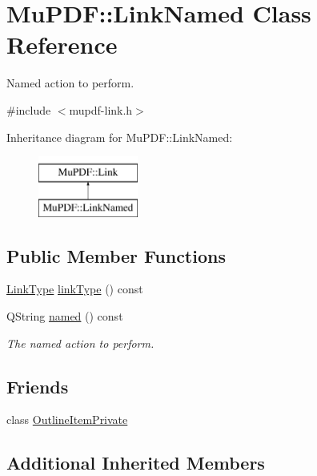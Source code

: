 \hypertarget{class_mu_p_d_f_1_1_link_named}{\section{Mu\-P\-D\-F\-:\-:Link\-Named Class Reference}
\label{class_mu_p_d_f_1_1_link_named}
}


Named action to perform.  




{\ttfamily \#include $<$mupdf-\/link.\-h$>$}

Inheritance diagram for Mu\-P\-D\-F\-:\-:Link\-Named\-:\begin{figure}[H]
\begin{center}
\leavevmode
\includegraphics[height=2.000000cm]{class_mu_p_d_f_1_1_link_named}
\end{center}
\end{figure}
\subsection*{Public Member Functions}
\begin{DoxyCompactItemize}
\item 
\hyperlink{class_mu_p_d_f_1_1_link_afdc6828b6e00f323b53d6ae36d0d06b6}{Link\-Type} \hyperlink{class_mu_p_d_f_1_1_link_named_af1037fb72e88df68b918b6f46a948ee1}{link\-Type} () const 
\item 
Q\-String \hyperlink{class_mu_p_d_f_1_1_link_named_a6573eed025194f585407d97373359595}{named} () const 
\begin{DoxyCompactList}\small\item\em The named action to perform. \end{DoxyCompactList}\end{DoxyCompactItemize}
\subsection*{Friends}
\begin{DoxyCompactItemize}
\item 
class \hyperlink{class_mu_p_d_f_1_1_link_named_ab008ed670017e41b6e6bba8707c775d2}{Outline\-Item\-Private}
\end{DoxyCompactItemize}
\subsection*{Additional Inherited Members}


